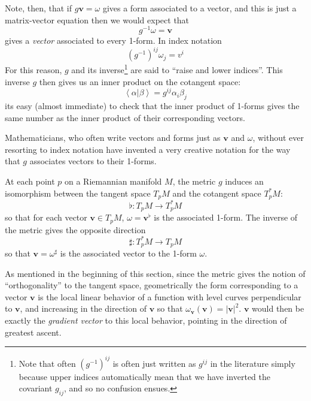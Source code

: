 	Note, then, that if $g \mathbf v = \omega$ gives a form associated to a vector, and this is just a matrix-vector equation then we would expect that 
	\begin{equation}
		g^{-1} \omega = \mathbf v
	\end{equation}
	gives a \emph{vector} associated to every 1-form. In index notation
	\begin{equation}
		(g^{-1})^{ij} \omega_j = v^i
	\end{equation}
	For this reason, $g$ and its inverse\footnote{Note that often $(g^{-1})^{ij}$ is often just written as $g^{ij}$ in the literature simply because upper indices automatically mean that we have inverted the covariant $g_{ij}$, and so no confusion ensues.} are said to ``raise and lower indices''. This inverse $g$ then gives us an inner product on the cotangent space:
	\begin{equation}
		\left< \alpha | \beta \right> = g^{ij} \alpha_i \beta_j
	\end{equation} 
	its easy (almost immediate) to check that the inner product of 1-forms gives the same number as the inner product of their corresponding vectors.
	
	Mathematicians, who often write vectors and forms just as $\mathbf v$ and $\omega$, without ever resorting to index notation have invented a very creative notation for the way that $g$ associates vectors to their 1-forms.
	\begin{prop}
		At each point $p$ on a Riemannian manifold $M$, the metric $g$ induces an isomorphism between the tangent space $T_pM$ and the cotangent space $T^*_pM$:
		\begin{equation}
			\flat: T_pM \rightarrow T^*_pM
		\end{equation}
		so that for each vector $\mathbf v \in T_pM$, $\omega = \mathbf v^\flat$ is the associated 1-form. The inverse of the metric gives the opposite direction
		\begin{equation}
			\sharp: T^*_pM \rightarrow T_pM
		\end{equation}
		so that $\mathbf v = \omega^\sharp$ is the associated vector to the 1-form $\omega$.
	\end{prop}

	As mentioned in the beginning of this section, since the metric gives the notion of ``orthogonality'' to the tangent space, geometrically the form corresponding to a vector $\mathbf v$ is the local linear behavior of a function with level curves perpendicular to $\mathbf v$, and increasing in the direction of $\mathbf v$ so that $\omega_{\mathbf v}(\mathbf v) = |\mathbf v|^2$. $\mathbf v$ would then be exactly the \emph{gradient vector} to this local behavior, pointing in the direction of greatest ascent. 
	
